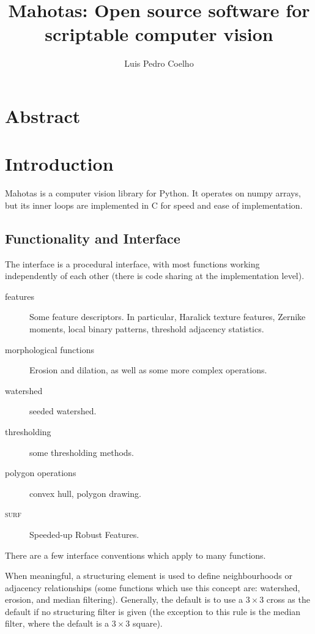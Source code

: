 \documentclass{article}
\title{Mahotas: Open source software for scriptable computer vision}
\author{Luis Pedro Coelho}
\newcommand*{\cpp}{{C\nolinebreak[4]\hspace{-.05em}\raisebox{.4ex}{\tiny\textbf{++}}}}
\begin{document}
\maketitle

\section*{Abstract}
\section{Introduction}

Mahotas is a computer vision library for Python. It operates on numpy arrays,
but its inner loops are implemented in \cpp{} for speed and ease of
implementation.

\subsection{Functionality and Interface}

The interface is a procedural interface, with most functions working
independently of each other (there is code sharing at the implementation
level).

\begin{description}
\item[features] Some feature descriptors. In particular, Haralick texture
features, Zernike moments, local binary patterns, threshold adjacency
statistics.
\item[morphological functions] Erosion and dilation, as well as some more
complex operations.
\item[watershed] seeded watershed.
\item[thresholding] some thresholding methods.
\item[polygon operations] convex hull, polygon drawing.
\item[\textsc{surf}] Speeded-up Robust Features.
\end{description}

There are a few interface conventions which apply to many functions.

When meaningful, a structuring element is used to define neighbourhoods or
adjacency relationships (some functions which use this concept are: watershed,
erosion, and median filtering). Generally, the default is to use a $3 \times 3$
cross as the default if no structuring filter is given (the exception to this
rule is the median filter, where the default is a $3 \times 3$ square).
\end{document}
